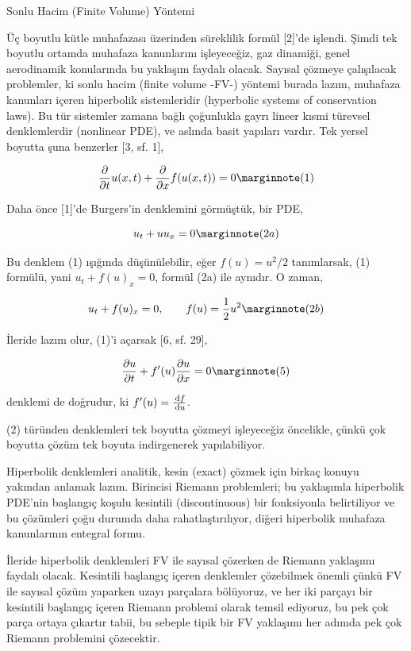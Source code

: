 \documentclass[12pt,fleqn]{article}\usepackage{../../common}
\begin{document}
Sonlu Hacim (Finite Volume) Yöntemi

Üç boyutlu kütle muhafazası üzerinden süreklilik formül [2]'de işlendi.  Şimdi
tek boyutlu ortamda muhafaza kanunlarını işleyeceğiz, gaz dinamiği, genel
aerodinamik konularında bu yaklaşım faydalı olacak. Sayısal çözmeye çalışılacak
problemler, ki sonlu hacim (finite volume -FV-) yöntemi burada lazım, muhafaza
kanunları içeren hiperbolik sistemleridir (hyperbolic systems of conservation
laws). Bu tür sistemler zamana bağlı çoğunlukla gayrı lineer kısmi türevsel
denklemlerdir (nonlinear PDE), ve aslında basit yapıları vardır. Tek yersel
boyutta şuna benzerler [3, sf. 1],

$$
\frac{\partial }{\partial t} u(x,t) + 
\frac{\partial }{\partial x} f(u(x,t)) = 0
\mlabel{1}
$$

Daha önce [1]'de Burgers'in denklemini görmüştük, bir PDE,

$$
u_t + uu_x = 0
\mlabel{2a}
$$

Bu denklem (1) ışığında düşünülebilir, eğer $f(u) = u^2/2$ tanımlarsak,
(1) formülü, yani $u_t + f(u)_x = 0$, formül (2a) ile aynıdır. O zaman,

$$
u_t + f(u)_x = 0, \qquad f(u) = \frac{1}{2}u^2
\mlabel{2b}
$$

İleride lazım olur, (1)'i açarsak [6, sf. 29],

$$
\frac{\partial u}{\partial t} + 
f'(u) \frac{\partial u}{\partial x} = 0
\mlabel{5}
$$

denklemi de doğrudur, ki $f'(u) = \frac{\,\mathrm{d} f}{\,\mathrm{d} u}$.

(2) türünden denklemleri tek boyutta çözmeyi işleyeceğiz öncelikle, çünkü çok
boyutta çözüm tek boyuta indirgenerek yapılabiliyor.

Hiperbolik denklemleri analitik, kesin (exact) çözmek için birkaç konuyu
yakından anlamak lazım. Birincisi Riemann problemleri; bu yaklaşımla hiperbolik
PDE'nin başlangıç koşulu kesintili (discontinuous) bir fonksiyonla belirtiliyor
ve bu çözümleri çoğu durumda daha rahatlaştırılıyor, diğeri hiperbolik muhafaza
kanunlarının entegral formu.

İleride hiperbolik denklemleri FV ile sayısal çözerken de Riemann yaklaşımı
faydalı olacak. Kesintili başlangıç içeren denklemler çözebilmek önemli çünkü FV
ile sayısal çözüm yaparken uzayı parçalara bölüyoruz, ve her iki parçayı bir
kesintili başlangıç içeren Riemann problemi olarak temsil ediyoruz, bu pek çok
parça ortaya çıkartır tabii, bu sebeple tipik bir FV yaklaşımı her adımda pek
çok Riemann problemini çözecektir.
\end{document}
